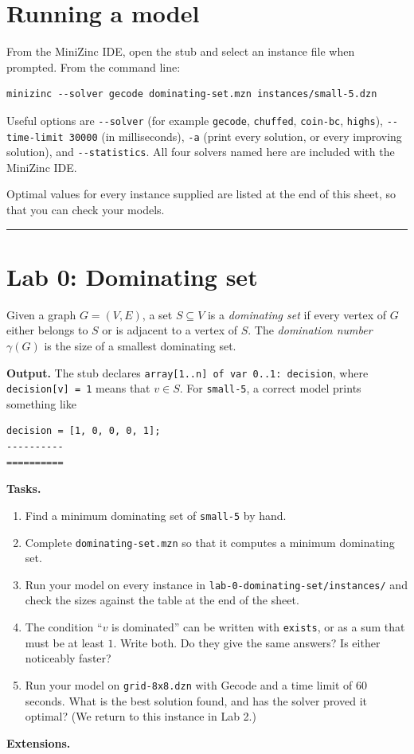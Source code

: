 \documentclass[11pt]{article}
\begin{document}
\section*{Running a model}

From the MiniZinc IDE, open the stub and select an instance file when prompted. From the command line:

\begin{Verbatim}
minizinc --solver gecode dominating-set.mzn instances/small-5.dzn
\end{Verbatim}
Useful options are \mbox{\texttt{-{}-{}solver}} (for example \mbox{\texttt{gecode}}, \mbox{\texttt{chuffed}}, \mbox{\texttt{coin-{}bc}}, \mbox{\texttt{highs}}), \mbox{\texttt{-{}-{}time-{}limit 30000}} (in milliseconds), \mbox{\texttt{-{}a}} (print every solution, or every improving solution), and \mbox{\texttt{-{}-{}statistics}}. All four solvers named here are included with the MiniZinc IDE.

Optimal values for every instance supplied are listed at the end of this sheet, so that you can check your models.

\bigskip\hrule\bigskip

\section*{Lab 0: Dominating set}

Given a graph $G = (V, E)$, a set $S \subseteq V$ is a \emph{dominating set} if every vertex of $G$ either belongs to $S$ or is adjacent to a vertex of $S$. The \emph{domination number} $\gamma(G)$ is the size of a smallest dominating set.

\textbf{Output.} The stub declares \texttt{array[1..n] of var 0..1: decision}, where \mbox{\texttt{decision[v] = 1}} means that $v \in S$. For \mbox{\texttt{small-{}5}}, a correct model prints something like

\begin{Verbatim}
decision = [1, 0, 0, 0, 1];
----------
==========
\end{Verbatim}
\textbf{Tasks.}

\begin{enumerate}
\item Find a minimum dominating set of \mbox{\texttt{small-{}5}} by hand.
\item Complete \mbox{\texttt{dominating-{}set.mzn}} so that it computes a minimum dominating set.
\item Run your model on every instance in \texttt{lab-{}0-{}dominating-{}set/\allowbreak{}instances/\allowbreak{}} and check the sizes against the table at the end of the sheet.
\item The condition ``$v$ is dominated'' can be written with \mbox{\texttt{exists}}, or as a sum that must be at least $1$. Write both. Do they give the same answers? Is either noticeably faster?
\item Run your model on \mbox{\texttt{grid-{}8x8.dzn}} with Gecode and a time limit of 60 seconds. What is the best solution found, and has the solver proved it optimal? (We return to this instance in Lab 2.)
\end{enumerate}
\textbf{Extensions.}
\end{document}
